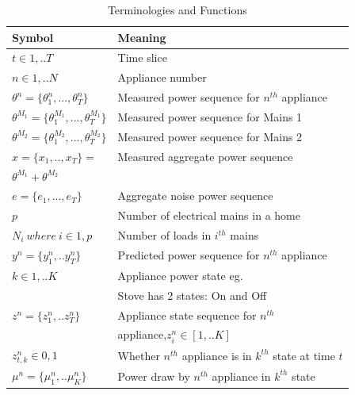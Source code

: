 \documentclass[conference]{IEEEtran}
\begin{document}
\begin{table}[ht!]
\vspace{-12pt}
\caption{Terminologies and Functions}
\vspace{-10pt}
\label{tab:terms}
\begin{tabular}{|l|l|}
\hline
Symbol&Meaning\\[0.1cm]
\hline
$t\in {1,..T}$& Time slice\\[0.1cm]
\hline
$n\in{1,..N}$ & Appliance number\\[0.1cm]
\hline
$\theta^n=\{\theta_1^n,...,\theta_T^n\}$ & Measured power sequence for $n^{th}$ appliance\\[0.1cm]
\hline
$\theta^{M_1}=\{\theta_1^{M_1},...,\theta_T^{M_1}\}$ & Measured power sequence for Mains 1\\[0.1cm]
\hline
$\theta^{M_2}=\{\theta_1^{M_2},...,\theta_T^{M_2}\}$ & Measured power sequence for Mains 2\\[0.1cm]
\hline
$x=\{ x_1,..,x_T\}=$ & Measured aggregate power sequence\\[0.1cm]
$\theta^{M_1}+\theta^{M_2}$ &\\[0.1cm]
\hline
$e=\{e_1,...,e_T\}$ & Aggregate noise power sequence\\[0.1cm]
\hline
$p$ & Number of electrical mains in a home\\[0.1cm]
\hline
$N_i \:where\:i \in {1,p}$ & Number of loads in $i^{th}$ mains\\[0.1cm]
\hline
$y^n=\{y_1^n,..y_T^n\}$ & Predicted power sequence for $n^{th}$ appliance\\[0.1cm]
\hline
$k\in {1,..K}$ & Appliance power state eg. \\
&Stove has 2 states: On and Off\\[0.1cm]
\hline
$z^n=\{z_1^n,..z_T^n\}$ & Appliance state sequence for $n^{th}$ \\[0.1cm]
& appliance,$z_i^n \in [1,..K]$\\[0.1cm]
\hline
$z_{t,k}^n \in{0,1}$ & Whether $n^{th}$ appliance is in $k^{th}$ state at time $t$\\[0.1cm]
\hline 
$\mu^n=\{\mu_1^n,..\mu_K^n\}$ & Power draw by $n^{th}$ appliance in $k^{th}$ state\\[0.1cm]

\end{tabular}
\end{table}
\end{document}
